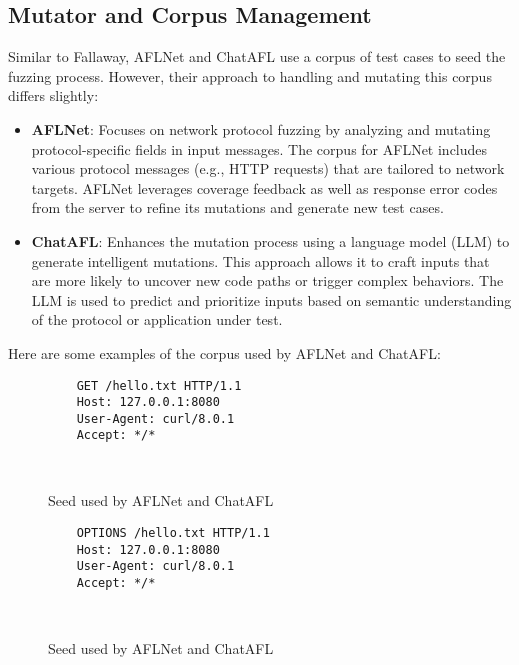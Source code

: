 \subsection{Mutator and Corpus Management}

Similar to Fallaway, AFLNet and ChatAFL use a corpus of test cases to seed the fuzzing process. However, their approach to handling and mutating this corpus differs slightly:

\begin{itemize}
    \item \textbf{AFLNet}: Focuses on network protocol fuzzing by analyzing and mutating protocol-specific fields in input messages. The corpus for AFLNet includes various protocol messages (e.g., HTTP requests) that are tailored to network targets. AFLNet leverages coverage feedback as well as response error codes from the server to refine its mutations and generate new test cases.

    \item \textbf{ChatAFL}: Enhances the mutation process using a language model (LLM) to generate intelligent mutations. This approach allows it to craft inputs that are more likely to uncover new code paths or trigger complex behaviors. The LLM is used to predict and prioritize inputs based on semantic understanding of the protocol or application under test.
\end{itemize}

Here are some examples of the corpus used by AFLNet and ChatAFL:
\begin{figure}[H]
    \centering
    \begin{adjustbox}{valign=t}
    \begin{lstlisting}
    GET /hello.txt HTTP/1.1
    Host: 127.0.0.1:8080
    User-Agent: curl/8.0.1
    Accept: */*
        
            
    \end{lstlisting}
    \end{adjustbox}
    \caption{Seed used by AFLNet and ChatAFL}
\end{figure}

\begin{figure}[H]
    \centering
    \begin{adjustbox}{valign=t}
    \begin{lstlisting}
    OPTIONS /hello.txt HTTP/1.1
    Host: 127.0.0.1:8080
    User-Agent: curl/8.0.1
    Accept: */*

    
    \end{lstlisting}
    \end{adjustbox}
    \caption{Seed used by AFLNet and ChatAFL}
\end{figure}

